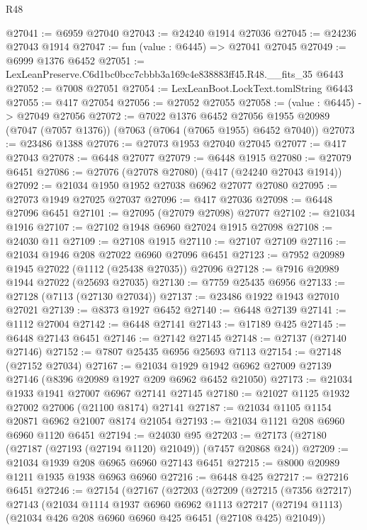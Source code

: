 \begin{lexlean}{R48}
\begin{coremodule}
@27041 := @6959 @27040
@27043 := @24240 @1914 @27036
@27045 := @24236 @27043 @1914
@27047 := fun (value : @6445) => @27041 @27045
@27049 := @6999 @1376 @6452
@27051 := LexLeanPreserve.C6d1bc0bcc7cbbb3a169c4e838883ff45.R48.__fits_35 @6443
@27052 := @7008 @27051
@27054 := LexLeanBoot.LockText.tomlString @6443
@27055 := @417 @27054
@27056 := @27052 @27055
@27058 := (value : @6445) -> @27049 @27056
@27072 := @7022
    @1376
    @6452
    @27056
    @1955
    @20989
    (@7047 (@7057 @1376))
    (@7063 (@7064 (@7065 @1955) @6452 @7040))
@27073 := @23486 @1388
@27076 := @27073 @1953 @27040 @27045
@27077 := @417 @27043
@27078 := @6448 @27077
@27079 := @6448 @1915
@27080 := @27079 @6451
@27086 := @27076 (@27078 @27080) (@417 (@24240 @27043 @1914))
@27092 := @21034 @1950 @1952 @27038 @6962 @27077 @27080
@27095 := @27073 @1949 @27025 @27037
@27096 := @417 @27036
@27098 := @6448 @27096 @6451
@27101 := @27095 (@27079 @27098) @27077
@27102 := @21034 @1916
@27107 := @27102 @1948 @6960 @27024 @1915 @27098
@27108 := @24030 @11
@27109 := @27108 @1915
@27110 := @27107 @27109
@27116 := @21034 @1946 @208 @27022 @6960 @27096 @6451
@27123 := @7952 @20989 @1945 @27022 (@1112 (@25438 @27035)) @27096
@27128 := @7916 @20989 @1944 @27022 (@25693 @27035)
@27130 := @7759 @25435 @6956
@27133 := @27128 (@7113 (@27130 @27034))
@27137 := @23486 @1922 @1943 @27010 @27021
@27139 := @8373 @1927 @6452
@27140 := @6448 @27139
@27141 := @1112 @27004
@27142 := @6448 @27141
@27143 := @17189 @425
@27145 := @6448 @27143 @6451
@27146 := @27142 @27145
@27148 := @27137 (@27140 @27146)
@27152 := @7807 @25435 @6956 @25693 @7113
@27154 := @27148 (@27152 @27034)
@27167 := @21034 @1929 @1942 @6962 @27009 @27139 @27146 (@8396 @20989 @1927 @209 @6962 @6452 @21050)
@27173 := @21034 @1933 @1941 @27007 @6967 @27141 @27145
@27180 := @21027 @1125 @1932 @27002 @27006 (@21100 @8174) @27141
@27187 := @21034 @1105 @1154 @20871 @6962 @21007 @8174 @21054
@27193 := @21034 @1121 @208 @6960 @6960 @1120 @6451
@27194 := @24030 @95
@27203 := @27173 (@27180 (@27187 (@27193 (@27194 @1120) @21049)) (@7457 @20868 @24))
@27209 := @21034 @1939 @208 @6965 @6960 @27143 @6451
@27215 := @8000 @20989 @1211 @1935 @1938 @6963 @6960
@27216 := @6448 @425
@27217 := @27216 @6451
@27246 := @27154
    (@27167
      (@27203
        (@27209
          (@27215
            (@7356 @27217)
            @27143
            (@21034
              @1114
              @1937
              @6960
              @6962
              @1113
              @27217
              (@27194 @1113)
              (@21034 @426 @208 @6960 @6960 @425 @6451 (@27108 @425) @21049))

\end{coremodule}
\end{lexlean}
